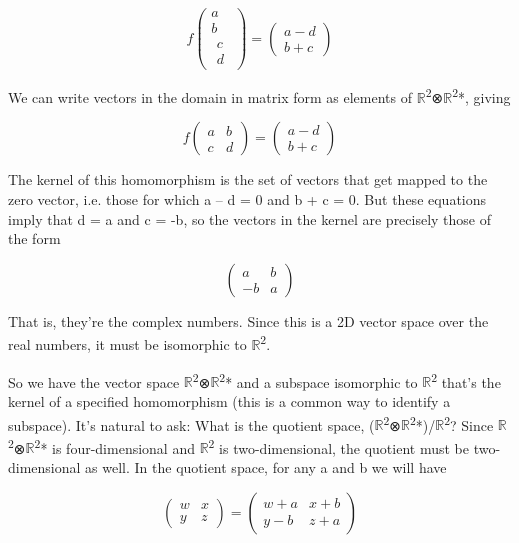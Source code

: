 \documentclass[oneside,english]{amsbook}
\numberwithin{section}{chapter}
\theoremstyle{plain}
\theoremstyle{definition}
\begin{document}
\[f\begin{pmatrix}
	a \\
	b \\
	\begin{matrix}
		c \\
		d
	\end{matrix}
\end{pmatrix} = \begin{pmatrix}
	a - d \\
	b + c
\end{pmatrix}\]

We can write vectors in the domain in matrix form as elements of
$\mathbb{R}$\textsuperscript{2}⊗$\mathbb{R}$\textsuperscript{2}*, giving

\[f\begin{pmatrix}
	a & b \\
	c & d
\end{pmatrix} = \begin{pmatrix}
	a - d \\
	b + c
\end{pmatrix}\]

The kernel of this homomorphism is the set of vectors that get mapped to
the zero vector, i.e. those for which a -- d = 0 and b + c = 0. But
these equations imply that d = a and c = -b, so the vectors in the
kernel are precisely those of the form

\[\begin{pmatrix}
	a & b \\
	- b & a
\end{pmatrix}\]

That is, they're the complex numbers. Since this is a 2D vector space
over the real numbers, it must be isomorphic to
$\mathbb{R}$\textsuperscript{2}.

So we have the vector space
$\mathbb{R}$\textsuperscript{2}⊗$\mathbb{R}$\textsuperscript{2}* and a
subspace isomorphic to $\mathbb{R}$\textsuperscript{2} that's the kernel
of a specified homomorphism (this is a common way to identify a
subspace). It's natural to ask: What is the quotient space,
($\mathbb{R}$\textsuperscript{2}⊗$\mathbb{R}$\textsuperscript{2}*)/$\mathbb{R}$\textsuperscript{2}?
Since $\mathbb{R}$\textsuperscript{2}⊗$\mathbb{R}$\textsuperscript{2}* is
four-dimensional and $\mathbb{R}$\textsuperscript{2} is two-dimensional,
the quotient must be two-dimensional as well. In the quotient space, for
any a and b we will have

\[\begin{pmatrix}
	w & x \\
	y & z
\end{pmatrix} = \begin{pmatrix}
	w + a & x + b \\
	y - b & z + a
\end{pmatrix}\]
\end{document}
